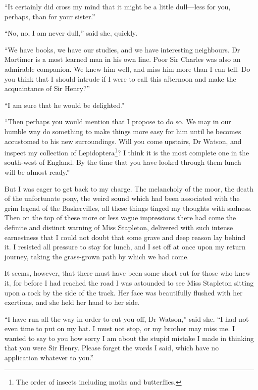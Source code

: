 \documentclass[paper=5.5in:8.5in,BCOR=7mm,twoside,DIV=calc,12pt,usegeometry,openany,chapterprefix,endperiod,headings=big]{scrbook} %
\begin{document}
\enquote{It certainly did cross my mind that it might be a little dull---less for you, perhaps, than for your sister.}

\enquote{No, no, I am never dull,} said she, quickly.

\enquote{We have books, we have our studies, and we have interesting neighbours. Dr Mortimer is a most learned man in his own line. Poor Sir Charles was also an admirable companion. We knew him well, and miss him more than I can tell. Do you think that I should intrude if I were to call this afternoon and make the acquaintance of Sir Henry?}

\enquote{I am sure that he would be delighted.}

\enquote{Then perhaps you would mention that I propose to do so. We may in our humble way do something to make things more easy for him until he becomes accustomed to his new surroundings. Will you come upstairs, Dr Watson, and inspect my collection of Lepidoptera\footnote{The order of insects including moths and butterflies.}? I think it is the most complete one in the south-west of England. By the time that you have looked through them lunch will be almost ready.}

But I was eager to get back to my charge. The melancholy of the moor, the death of the unfortunate pony, the weird sound which had been associated with the grim legend of the Baskervilles, all these things tinged my thoughts with sadness. Then on the top of these more or less vague impressions there had come the definite and distinct warning of Miss Stapleton, delivered with such intense earnestness that I could not doubt that some grave and deep reason lay behind it. I resisted all pressure to stay for lunch, and I set off at once upon my return journey, taking the grass-grown path by which we had come.

It seems, however, that there must have been some short cut for those who knew it, for before I had reached the road I was astounded to see Miss Stapleton sitting upon a rock by the side of the track. Her face was beautifully flushed with her exertions, and she held her hand to her side.

\enquote{I have run all the way in order to cut you off, Dr Watson,} said she. \enquote{I had not even time to put on my hat. I must not stop, or my brother may miss me. I wanted to say to you how sorry I am about the stupid mistake I made in thinking that you were Sir Henry. Please forget the words I said, which have no application whatever to you.}
\end{document}
